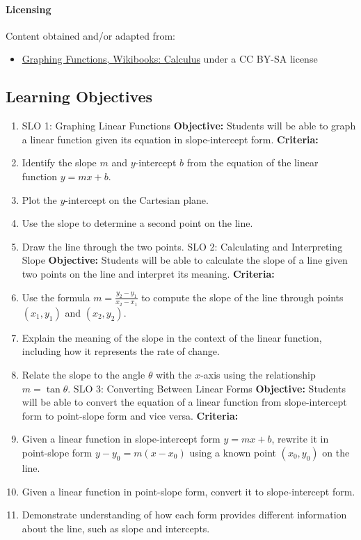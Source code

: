 \paragraph{Licensing}

Content obtained and/or adapted from:

\begin{itemize}
    \item \href{https://en.wikibooks.org/wiki/Calculus/Graphing_functions}{Graphing Functions, Wikibooks: Calculus} under a CC BY-SA license
\end{itemize}

\subsection{Learning Objectives}

\begin{enumerate}
    \item SLO 1: Graphing Linear Functions \textbf{Objective:} Students will be able to graph a linear function given its equation in slope-intercept form. \textbf{Criteria:}
    \item Identify the slope $m$ and $y$-intercept $b$ from the equation of the linear function $y = mx + b$.
    \item Plot the $y$-intercept on the Cartesian plane.
    \item Use the slope to determine a second point on the line.
    \item Draw the line through the two points. SLO 2: Calculating and Interpreting Slope \textbf{Objective:} Students will be able to calculate the slope of a line given two points on the line and interpret its meaning. \textbf{Criteria:}
    \item Use the formula $m = \frac{y_2 - y_1}{x_2 - x_1}$ to compute the slope of the line through points $(x_1, y_1)$ and $(x_2, y_2)$.
    \item Explain the meaning of the slope in the context of the linear function, including how it represents the rate of change.
    \item Relate the slope to the angle $\theta$ with the $x$-axis using the relationship $m = \tan \theta$. SLO 3: Converting Between Linear Forms \textbf{Objective:} Students will be able to convert the equation of a linear function from slope-intercept form to point-slope form and vice versa. \textbf{Criteria:}
    \item Given a linear function in slope-intercept form $y = mx + b$, rewrite it in point-slope form $y - y_0 = m(x - x_0)$ using a known point $(x_0, y_0)$ on the line.
    \item Given a linear function in point-slope form, convert it to slope-intercept form.
    \item Demonstrate understanding of how each form provides different information about the line, such as slope and intercepts.
\end{enumerate}

